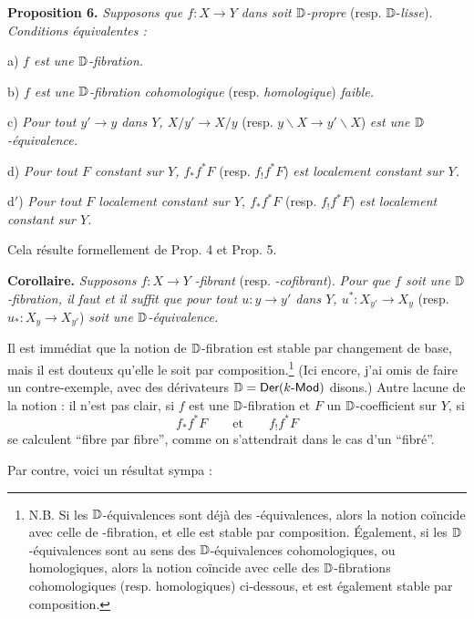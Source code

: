 \textbf{Proposition 6.} \textit{Supposons que $f : X \to Y$ dans \Dia{} soit $\mathbb{D}$-propre} (resp. $\mathbb{D}$-\textit{lisse}). \textit{Conditions équivalentes :}

a) \textit{$f$ est une $\mathbb{D}$-fibration.}

b) \textit{$f$ est une $\mathbb{D}$-fibration cohomologique} (resp. \textit{homologique}) \textit{faible.}

c) \textit{Pour tout $y' \to y$ dans $Y$, $X/y' \to X/y$} (resp. $y\backslash X \to y'\backslash X$) \textit{est une $\mathbb{D}$-équivalence.}

d) \textit{Pour tout $F$ constant sur $Y$, $f_*f^*F$} (resp. $f_!f^*F$) \textit{est localement constant sur $Y$.}

d$'$) \textit{Pour tout $F$ localement constant sur $Y$, $f_*f^*F$} (resp. $f_!f^*F$) \textit{est localement constant sur $Y$.}

Cela résulte formellement de Prop. 4 et Prop. 5.

\textbf{Corollaire.} \textit{Supposons $f : X \to Y$} \Cat\textit{-fibrant} (resp. \Cat\textit{-cofibrant}). \textit{Pour que $f$ soit une $\mathbb{D}$-fibration, il faut et il suffit que pour tout $u : y \to y'$ dans $Y$, $u^* : X_{y'} \to X_y$} (resp. $u_* : X_y \to X_{y'}$) \textit{soit une $\mathbb{D}$-équivalence.}

Il est immédiat que la notion de $\mathbb{D}$-fibration est stable par changement de base, mais il est douteux qu'elle le soit par composition.\footnote[60]{N.B. Si les $\mathbb{D}$-équivalences sont déjà des \Hot-équivalences, alors la notion coïncide avec celle de \Hot-fibration, et elle est stable par composition. Également, si les $\mathbb{D}$-équivalences sont au sens des $\mathbb{D}$-équivalences cohomologiques, ou homologiques, alors la notion coïncide avec celle des $\mathbb{D}$-fibrations cohomologiques (resp. homologiques) ci-dessous, et est également stable par composition.} (Ici encore, j'ai omis de faire un contre-exemple, avec des dérivateurs $\mathbb{D} = \textsf{\upshape Der}(k\text{-}\textsf{\upshape Mod})$ disons.) Autre lacune de la notion : il n'est pas clair, si $f$ est une $\mathbb{D}$-fibration et $F$ un $\mathbb{D}$-coefficient sur $Y$, si
\[
f_*f^*F \qquad \text{et} \qquad f_!f^*F
\]
se calculent “fibre par fibre”, comme on s'attendrait dans le cas d'un “fibré”.

Par contre, voici un résultat sympa :

